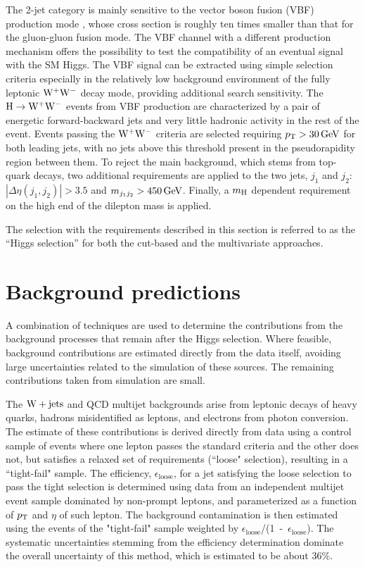 \documentclass[12pt,twoside,a4paper,cmspaper,final,collab]{cms-tdr}
\begin{document}
The 2-jet category is mainly sensitive to the vector boson fusion (VBF) production mode
\cite{Ciccolini:2007jr, Ciccolini:2007ec, Arnold:2008rz}, whose
cross section is roughly ten times smaller than that for the
gluon-gluon fusion mode. The VBF channel with a different production mechanism offers the
possibility to test the compatibility of an eventual signal with the SM Higgs.
The VBF signal can be extracted
using simple selection criteria especially in the relatively low background environment
of the fully leptonic $\mathrm{W^+}{}\mathrm{W^-}$ decay mode, providing additional search sensitivity.
The $\mathrm{H}\to\mathrm{W^+}{}\mathrm{W^-}$ events from VBF production are characterized by a pair of
energetic forward-backward jets and very little hadronic activity in
the rest of the event.
Events passing the $\mathrm{W^+}{}\mathrm{W^-}$ criteria are selected requiring $p_{\mathrm{T}}>30\,\text{Ge\hspace{-.08em}V}$
for both leading jets, with no jets above this threshold
present in the pseudorapidity region between them.
To reject
the main background, which stems from top-quark decays, two additional requirements are applied
to the two jets, $j_1$ and $j_2$: $|\Delta\eta (j_1,j_2)| > 3.5$ and
$m_{j_1j_2} >450\,\text{Ge\hspace{-.08em}V}$. Finally, a $m_{\mathrm{H}}$ dependent requirement on
the high end of the dilepton mass is applied.

The selection with the requirements described in this section is referred to
as the ``Higgs selection'' for both the cut-based and the multivariate approaches.

\section{Background predictions}
\label{sec:backgrounds}

A combination of techniques are used to determine the contributions from the background
processes that remain after the Higgs selection.
Where feasible, background contributions are estimated directly from
the data itself, avoiding large uncertainties related to
the simulation of these sources. The remaining contributions
taken from simulation are small.

The $\mathrm{W}+\mathrm{jets}$ and QCD multijet backgrounds arise from leptonic
decays of heavy quarks, ha\-drons misidentified as leptons, and electrons
from photon conversion. The estimate of these contributions is derived
directly from data using a control sample of events where one lepton
passes the standard criteria and the other does not, but satisfies a
relaxed set of requirements (``loose" selection), resulting in a
``tight-fail" sample.
The efficiency, $\epsilon_\text{loose}$, for a jet satisfying the loose
selection to pass the tight selection is determined using data from an
independent multijet event sample dominated by non-prompt leptons, and
parameterized as a function of $p_{\mathrm{T}}$ and $\eta$ of such lepton. The background
contamination is then estimated using the events of the "tight-fail"
sample weighted by \mbox{$\epsilon_\text{loose}$/(1 - $\epsilon_\text{loose}$)}. The
systematic uncertainties stemming from the efficiency determination
dominate the overall uncertainty of this method, which is estimated
to be about 36\%.
\end{document}
